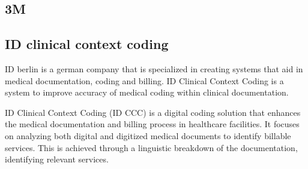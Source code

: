 \subsection{3M}

\subsection{ID clinical context coding}
ID berlin is a german company that is specialized in creating systems that aid in medical documentation, coding and billing.
ID Clinical Context Coding is a system to improve accuracy of medical coding within clinical documentation.



ID Clinical Context Coding (ID CCC) is a digital coding solution that enhances the medical documentation and billing process in healthcare facilities.
It focuses on analyzing both digital and digitized medical documents to identify billable services.
This is achieved through a linguistic breakdown of the documentation, identifying relevant services. \cite{Diekmann2008}

